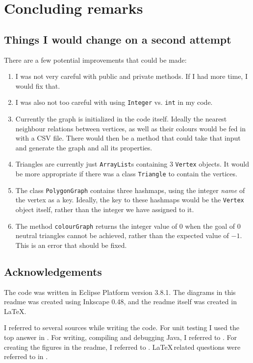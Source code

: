 \documentclass[letterpaper,10pt]{article}
\def\code#1{\texttt{#1}}
\begin{document}
\section{Concluding remarks}
\subsection{Things I would change on a second attempt}
There are a few potential improvements that could be made:
\begin{enumerate}
 \item I was not very careful with public and private methods.  If I had more time, I would fix that.
 \item I was also not too careful with using \code{Integer} vs. \code{int} in my code.
 \item Currently the graph is initialized in the code itself.  Ideally the nearest neighbour relations between vertices, as well as their colours 
 would be fed in with a CSV file.  There would then be a method that could take that input and generate the graph and all its properties.
 \item Triangles are currently just \code{ArrayList}s containing 3 \code{Vertex} objects.  It would be more appropriate if there was a class 
 \code{Triangle} to contain the vertices.
 \item The class \code{PolygonGraph} contains three hashmaps, using the integer \textit{name} of the vertex as a key.  Ideally, the key to these 
 hashmaps would be the \code{Vertex} object itself, rather than the integer we have assigned to it.
 \item The method \code{colourGraph} returns the integer value of $0$ when the goal of $0$ neutral triangles cannot be achieved, rather than 
 the expected value of $-1$.  This is an error that should be fixed.
\end{enumerate}


\subsection{Acknowledgements}
The code was written in Eclipse Platform version 3.8.1.  The diagrams in this readme was created using Inkscape 0.48, and the readme itself was created 
in \LaTeX.


I referred to several sources while writing the code.  For unit testing I used the top answer in \cite{unittesting}. For writing, compiling and debugging Java,
I referred to \cite{basicjava}.  For creating the figures in the readme, I referred to \cite{inkscape}.  \LaTeX\,related questions were 
referred to in \cite{tex}.
\end{document}
